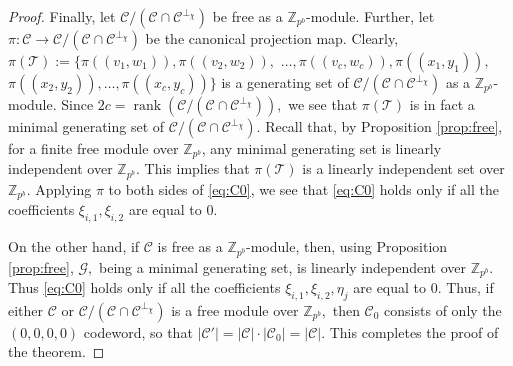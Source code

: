 \documentclass{article}
\DeclareMathOperator{\rank}{rank}
\theoremstyle{remark}
\theoremstyle{definition}
\numberwithin{equation}{section}
\begin{document}
\begin{proof}
Finally, let $\mathcal{C}/(\mathcal{C} \cap \mathcal{C}^{\perp_\chi})$ be free as a $\mathbb{Z}_{p^b}$-module. Further, let $\pi : \mathcal{C}  \to \mathcal{C}/(\mathcal{C} \cap \mathcal{C}^{\perp_\chi})$ be the canonical projection map. Clearly, $\pi(\mathcal{T}) := \{\pi((v_1,w_1)),\pi((v_2,w_2)),$ $\ldots, \pi((v_{c},w_{c})),\pi((x_1,y_1)),$ $\pi((x_2,y_2)),\ldots, \pi((x_{c},y_{c}))\}$ is a generating set of $\mathcal{C}/(\mathcal{C} \cap \mathcal{C}^{\perp_\chi})$ as a $\mathbb{Z}_{p^b}$-module. Since $2c= \rank(\mathcal{C}/(\mathcal{C} \cap \mathcal{C}^{\perp_\chi})),$ we see that $\pi(\mathcal{T})$ is in fact a minimal generating set of $\mathcal{C}/(\mathcal{C} \cap \mathcal{C}^{\perp_\chi})$. 
Recall  that, by Proposition \ref{prop:free}, for a finite  free  module over $\mathbb{Z}_{p^b}$, any minimal generating set  is linearly independent over $\mathbb{Z}_{p^b}.$ This implies that $\pi(\mathcal{T})$ is a linearly independent set over $\mathbb{Z}_{p^b}.$ Applying $\pi$ to both sides of \eqref{eq:C0}, we see that \eqref{eq:C0} holds only if all the coefficients $\xi_{i,1},\xi_{i,2}$ are equal to $0$. 

On the other hand, if $\mathcal{C}$ is free as a  $\mathbb{Z}_{p^b}$-module, then, using Proposition \ref{prop:free}, $\mathcal{G},$ being a minimal generating set, is linearly independent over $\mathbb{Z}_{p^b}.$  Thus \eqref{eq:C0} holds only if all the coefficients $\xi_{i,1},\xi_{i,2},\eta_j$ are equal to $0$. Thus, if either $\mathcal{C}$ or $\mathcal{C}/(\mathcal{C} \cap \mathcal{C}^{\perp_\chi})$ is a free module over $\mathbb{Z}_{p^b},$ then $\mathcal{C}_0$ consists of only the $(0,0,0,0)$ codeword, so that $|\mathcal{C}'|=|\mathcal{C}|\cdot |\mathcal{C}_0| = |\mathcal{C}|$.  This completes the proof of the theorem.
\end{proof}

%
\end{document}
